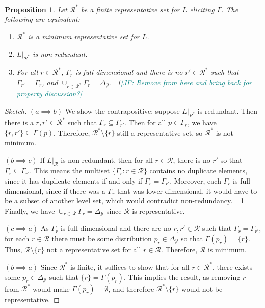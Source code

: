 \documentclass[12pt]{article}
\newcommand{\Comments}{1}
\newcommand{\mynote}[2]{\ifnum\Comments=1\textcolor{#1}{#2}\fi}
\newcommand{\mytodo}[2]{\ifnum\Comments=1%
  \todo[linecolor=#1!80!black,backgroundcolor=#1,bordercolor=#1!80!black]{#2}\fi}
\newcommand{\jessie}[1]{\mynote{teal}{[JF: #1]}}
\newcommand{\jessiet}[1]{\mytodo{teal!20!white}{JF: #1}}
\newcommand{\simplex}{\Delta_\Y}
\newcommand{\R}{\mathcal{R}}
\newcommand{\Y}{\mathcal{Y}}
\newtheorem{proposition}{Proposition}
\begin{document}
\begin{proposition}\label{prop:tfae-min-rep-nonredundant}
  Let $\R^*$ be a finite representative set for $L$ eliciting $\Gamma$.
  The following are equivalent:
  \begin{enumerate}
  \item[a.] $\R^*$ is a minimum representative set for $L$.
  \item[b.] $L|_{\R^*}$ is non-redundant.
  \item[c.] For all $r \in \R^*$, $\Gamma_r$ is full-dimensional and there is no $r' \in \R^*$ such that $\Gamma_{r'}= \Gamma_r$, and $\cup_{r\in\R^*} \Gamma_r = \simplex$.\jessie{Remove from here and bring back for property discussion?}
  \end{enumerate}
\end{proposition}
\begin{proof}[Sketch]
  $(a \implies b)$  
  We show the contrapositive: suppose $L|_{R^*}$ is redundant.
  Then there is a $r,r' \in \R^*$ such that $\Gamma_r \subseteq \Gamma_{r'}$.
  Then for all $p \in \Gamma_r$, we have $\{r, r'\} \subseteq \Gamma(p)$.
  Therefore, $\R^* \setminus \{r\}$ still a representative set, so $\R^*$ is not minimum.
  
  $(b \implies c)$
  If $L|_\R$ is non-redundant, then for all $r \in \R$, there is no $r'$ so that $\Gamma_r \subseteq \Gamma_{r'}$.
  This means the multiset $\{\Gamma_r : r \in \R\}$ contains no duplicate elements, since it has duplicate elements if and only if $\Gamma_r = \Gamma_{r'}$.
  Moreover, each $\Gamma_r$ is full-dimensional, since if there was a $\Gamma_r$ that was lower dimensional, it would have to be a subset of another level set, which would contradict non-redundancy. \jessiet{Hand waving here}
  Finally, we have $\cup_{r \in \R} \Gamma_r = \simplex$ since $\R$ is representative.
  
  $(c \implies a)$
  As $\Gamma_r$ is full-dimensional and there are no $r, r' \in \R$ such that $\Gamma_r = \Gamma_{r'}$, for each $r \in \R$ there must be some distribution $p_r \in \simplex$ so that $\Gamma(p_r) = \{r\}$.
  Thus, $\R \setminus \{r\}$ not a representative set for all $r \in \R$.
  Therefore, $\R$ is minimum.
  
  $(b \implies a)$
  Since $\R^*$ is finite, it suffices to show that for all $r \in \R^*$, there exists some $p_r \in \simplex$ such that $\{r\} = \Gamma(p_r)$.
  This implies the result, as removing $r$ from $\R^*$ would make $\Gamma(p_r) = \emptyset$, and therefore $\R^* \setminus \{r\}$ would not be representative.
  

\end{proof}
\end{document}
